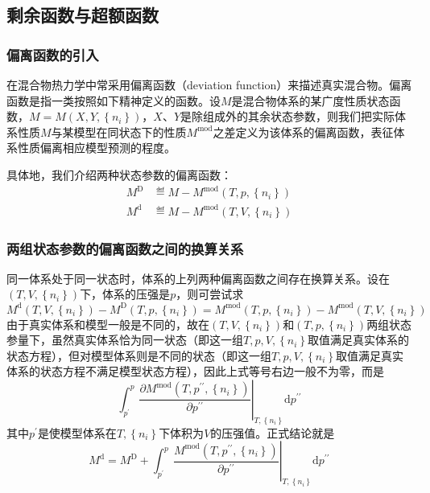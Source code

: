 \documentclass[main.tex]{subfiles}
\begin{document}
\subsection{剩余函数与超额函数}
\subsubsection{偏离函数的引入}
在混合物热力学中常采用偏离函数（deviation function）来描述真实混合物。偏离函数是指一类按照如下精神定义的函数。设$M$是混合物体系的某广度性质状态函数，$M=M\left(X,Y,\left\{n_i\right\}\right)$，$X$、$Y$是除组成外的其余状态参数，则我们把实际体系性质$M$与某模型在同状态下的性质$M^\text{mod}$之差定义为该体系的偏离函数，表征体系性质偏离相应模型预测的程度。

具体地，我们介绍两种状态参数的偏离函数：
\begin{align}
    M^\text{D} & \eqdef M-M^\text{mod}\left(T,p,\left\{n_i\right\}\right)\label{eq:II.4_def_deviation_function_D} \\
    M^\text{d} & \eqdef M-M^\text{mod}\left(T,V,\left\{n_i\right\}\right)\label{eq:II.4_def_deviation_function_d}
\end{align}

\subsubsection{两组状态参数的偏离函数之间的换算关系}
同一体系处于同一状态时，体系的上列两种偏离函数之间存在换算关系。设在$\left(T,V,\left\{n_i\right\}\right)$下，体系的压强是$p$，则可尝试求
\[M^\text{d}\left(T,V,\left\{n_i\right\}\right)-M^\text{D}\left(T,p,\left\{n_i\right\}\right)=M^\text{mod}\left(T,p,\left\{n_i\right\}\right)-M^\text{mod}\left(T,V,\left\{n_i\right\}\right)\]
由于真实体系和模型一般是不同的，故在$\left(T,V,\left\{n_i\right\}\right)$和$\left(T,p,\left\{n_i\right\}\right)$两组状态参量下，虽然真实体系恰为同一状态（即这一组$T,p,V,\left\{n_i\right\}$取值满足真实体系的状态方程），但对模型体系则是不同的状态（即这一组$T,p,V,\left\{n_i\right\}$取值满足真实体系的状态方程不满足模型状态方程），因此上式等号右边一般不为零，而是
\[\int_{p^\prime}^p\left.\frac{\partial M^\text{mod}\left(T,p^{\prime\prime},\left\{n_i\right\}\right)}{\partial p^{\prime\prime}}\right|_{T,\left\{n_i\right\}}\mathrm{d}p^{\prime\prime}\]
其中$p^\prime$是使模型体系在$T,\left\{n_i\right\}$下体积为$V$的压强值。正式结论就是
\begin{equation}\label{eq:II.4_deviation_function_relation}
    M^\text{d}=M^\text{D}+\int_{p^\prime}^p\left.\frac{M^\text{mod}\left(T,p^{\prime\prime},\left\{n_i\right\}\right)}{\partial p^{\prime\prime}}\right|_{T,\left\{n_i\right\}}\mathrm{d}p^{\prime\prime}
\end{equation}
\end{document}
